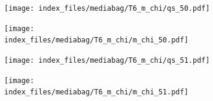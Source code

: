 \documentclass[
  11pt,
  letterpaper,
]{scrreprt}
\begin{document}
\begin{figure}

\begin{minipage}{0.50\linewidth}

\begin{figure}[H]

{\centering \texttt{[image: index\_files/mediabag/T6\_m\_chi/qs\_50.pdf]}

}


\end{figure}%

\end{minipage}%
%
\begin{minipage}{0.50\linewidth}

\begin{figure}[H]

{\centering \texttt{[image: index\_files/mediabag/T6\_m\_chi/m\_chi\_50.pdf]}

}


\end{figure}%

\end{minipage}%

\end{figure}%

\begin{figure}

\begin{minipage}{0.50\linewidth}

\begin{figure}[H]

{\centering \texttt{[image: index\_files/mediabag/T6\_m\_chi/qs\_51.pdf]}

}


\end{figure}%

\end{minipage}%
%
\begin{minipage}{0.50\linewidth}

\begin{figure}[H]

{\centering \texttt{[image: index\_files/mediabag/T6\_m\_chi/m\_chi\_51.pdf]}

}


\end{figure}%

\end{minipage}%

\end{figure}%
\end{document}
